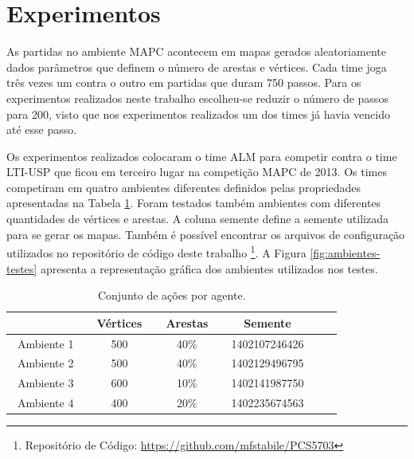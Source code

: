 \documentclass{llncs}
\begin{document}
\section{Experimentos}

As partidas no ambiente MAPC acontecem em mapas gerados aleatoriamente dados parâmetros que definem o número de arestas e vértices. Cada time joga três vezes um contra o outro em partidas que duram 750 passos. Para os experimentos realizados neste trabalho escolheu-se reduzir o número de passos para 200, visto que nos experimentos realizados um dos times já havia vencido até esse passo.

Os experimentos realizados colocaram o time ALM para competir contra o time LTI-USP que ficou em terceiro lugar na competição MAPC de 2013. Os times competiram em quatro ambientes diferentes definidos pelas propriedades apresentadas na Tabela \ref{table:ambientes}. Foram testados também ambientes com diferentes quantidades de vértices e arestas. A coluna semente define a semente utilizada para se gerar os mapas. Também é possível encontrar os arquivos de configuração utilizados no repositório de código deste trabalho \footnote{Repositório de Código: \url{https://github.com/mfstabile/PCS5703}}. A Figura \ref{fig:ambientes-testes} apresenta a representação gráfica dos ambientes utilizados nos testes.

\begin{table}[!h]
\centering
\begin{tabular}{|c|c|c|c|c|c|}
  \hline
               & ~Vértices~ & ~Arestas~ &    Semente    \\ \hline
  ~Ambiente 1~ &   500    &   40\%  & ~1402107246426~ \\ \hline
  ~Ambiente 2~ &   500    &   40\%  & ~1402129496795~ \\ \hline
  ~Ambiente 3~ &   600    &   10\%  & ~1402141987750~ \\ \hline
  ~Ambiente 4~ &   400    &   20\%  & ~1402235674563~ \\ \hline
\end{tabular}
\caption{Conjunto de ações por agente.}
\label{table:ambientes}
\end{table}
\end{document}

